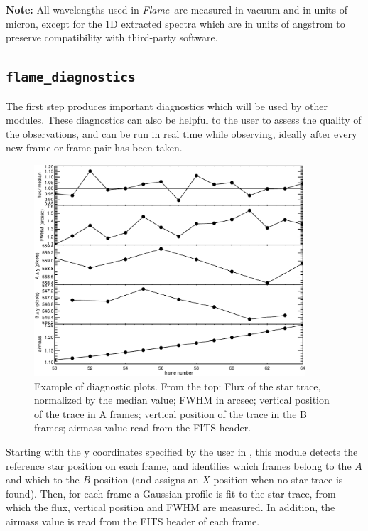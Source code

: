 \documentclass[a4paper]{article}
\newcommand{\flame}{\emph{Flame}}
\begin{document}
\begin{sloppypar}
\medskip
\noindent
\textbf{Note:} All wavelengths used in \flame\ are measured in vacuum and in units of micron, except for the 1D extracted spectra which are in units of angstrom to preserve compatibility with third-party software.




\subsection{\texttt{flame\_diagnostics}}
\label{sec:diagnostics}

The first step produces important diagnostics which will be used by other modules. These diagnostics can also be helpful to the user to assess the quality of the observations, and can be run in real time while observing, ideally after every new frame or frame pair has been taken.

\begin{figure}[htbp]
\centering
\includegraphics[width=0.9\textwidth]{diagnostics}
\caption{Example of diagnostic plots. From the top: Flux of the star trace, normalized by the median value; FWHM in arcsec; vertical position of the trace in A frames; vertical position of the trace in the B frames; airmass value read from the FITS header.}
\label{fig:diagnostics}
\end{figure}

Starting with the y coordinates specified by the user in , this module detects the reference star position on each frame, and identifies which frames belong to the $A$ and which to the $B$ position (and assigns an $X$ position when no star trace is found). Then, for each frame a Gaussian profile is fit to the star trace, from which the flux, vertical position and FWHM are measured. In addition, the airmass value is read from the FITS header of each frame.


\end{sloppypar}
\end{document}
